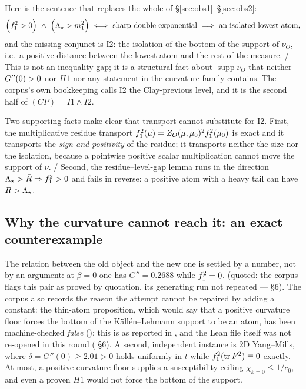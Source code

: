 Here is the sentence that replaces the whole of \S\ref{sec:obs1}--\S\ref{sec:obs2}:
\begin{equation}
\Bigl(\fone>0\Bigr)\ \wedge\ \Bigl(\Lstar>m_1^{2}\Bigr)
\ \Longleftrightarrow\ \text{sharp double exponential}
\ \Longrightarrow\ \text{an isolated lowest atom},
\label{eq:onestep5}
\end{equation}
and the missing conjunct is I2: the isolation of the bottom of the support of $\nu_O$, i.e.\ a
positive distance between the lowest atom and the rest of the measure. \LT{}/ \LM{} This is not
an inequality gap; it is a structural fact about $\operatorname{supp}\nu_O$ that neither
$G''(0)>0$ nor $H1$ nor any statement in the curvature family contains. The corpus's own bookkeeping
calls I2 the Clay-previous level, and it is the second half of $(CP)=I1\wedge I2$.

Two supporting facts make clear that transport cannot substitute for I2. First, the multiplicative
residue transport $f_1^2(\mu)=Z_O(\mu,\mu_0)^{2}f_1^2(\mu_0)$ is exact and it transports the
\emph{sign and positivity} of the residue; it transports neither the size nor the isolation,
because a pointwise positive scalar multiplication cannot move the support of $\nu$. \LT{}/ \LC{}
Second, the residue--level-gap lemma runs in the direction $\Lambda_{\star}>\bar R\Rightarrow f_1^2>0$ and
fails in reverse: a positive atom with a heavy tail can have $\bar R>\Lambda_{\star}$. \LT{}


\subsection{Why the curvature cannot reach it: an exact counterexample}

The relation between the old object and the new one is settled by a number, not by an argument:
at $\beta=0$ one has $G''=0.2688$ while $f_1^2=0$. \LT{} (quoted: the corpus flags this pair as
proved by quotation, its generating run not repeated ---  \S6). The corpus also
records the reason the attempt cannot be repaired by adding a constant: the thin-atom proposition,
which would say that a positive curvature floor forces the bottom of the K\"all\'en--Lehmann support
to be an atom, has been machine-checked \emph{false} (); this is
\LT{} as reported in , and the Lean file itself was not re-opened in this
round ( \S6). A second, independent instance is 2D Yang--Mills, where
$\delta=G''(0)\ge2.01>0$ holds uniformly in $t$ while $f_1^2(\operatorname{tr} F^{2})\equiv0$ exactly. \LT{} At
most, a positive curvature floor supplies a susceptibility ceiling $\chi_{k=0}\le1/c_0$, and even a
proven $H1$ would not force the bottom of the support.

